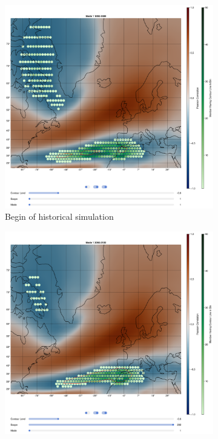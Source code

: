 \begin{figure}[!htb]
  \begin{subfigure}[b]{0.49\textwidth}
    \includegraphics[width=\textwidth]{figures/psl_ivt_cor_mode1_historical.png}
    \caption{Begin of historical simulation}
    \label{fig:psl eof ivt cor historical mode1}
  \end{subfigure}
  \hfill
  \begin{subfigure}[b]{0.49\textwidth}
    \includegraphics[width=\textwidth]{figures/psl_ivt_cor_mode1_ssp126.png}

\end{subfigure}
\end{figure}
